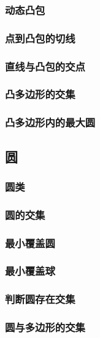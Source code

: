 \documentclass[a4paper]{article}
\begin{document}
\subsubsection{动态凸包}

\subsubsection{点到凸包的切线}

\subsubsection{直线与凸包的交点}

\subsubsection{凸多边形的交集}

\subsubsection{凸多边形内的最大圆}

\subsection{圆}

\subsubsection{圆类}

\subsubsection{圆的交集}

\subsubsection{最小覆盖圆}

\subsubsection{最小覆盖球}

\subsubsection{判断圆存在交集}

\subsubsection{圆与多边形的交集}
\end{document}
